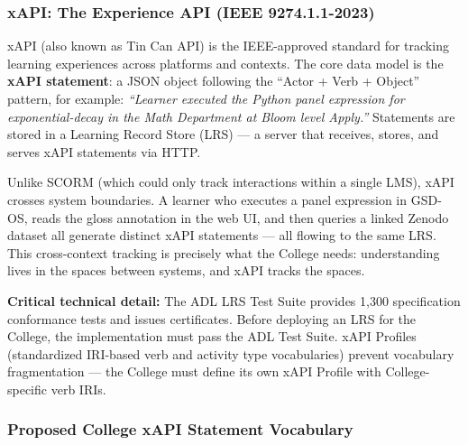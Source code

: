 \documentclass[11pt,letterpaper]{article}
\begin{document}
\subsubsection{xAPI: The Experience API (IEEE 9274.1.1-2023)}

xAPI (also known as Tin Can API) is the IEEE-approved standard for tracking learning experiences across platforms and contexts. The core data model is the \textbf{xAPI statement}: a JSON object following the ``Actor + Verb + Object'' pattern, for example: \textit{``Learner executed the Python panel expression for exponential-decay in the Math Department at Bloom level Apply.''} Statements are stored in a Learning Record Store (LRS) --- a server that receives, stores, and serves xAPI statements via HTTP.

Unlike SCORM (which could only track interactions within a single LMS), xAPI crosses system boundaries. A learner who executes a panel expression in GSD-OS, reads the gloss annotation in the web UI, and then queries a linked Zenodo dataset all generate distinct xAPI statements --- all flowing to the same LRS. This cross-context tracking is precisely what the College needs: understanding lives in the spaces between systems, and xAPI tracks the spaces.

\textbf{Critical technical detail:} The ADL LRS Test Suite provides 1,300 specification conformance tests and issues certificates. Before deploying an LRS for the College, the implementation must pass the ADL Test Suite. xAPI Profiles (standardized IRI-based verb and activity type vocabularies) prevent vocabulary fragmentation --- the College must define its own xAPI Profile with College-specific verb IRIs.

\subsubsection{Proposed College xAPI Statement Vocabulary}
\end{document}
